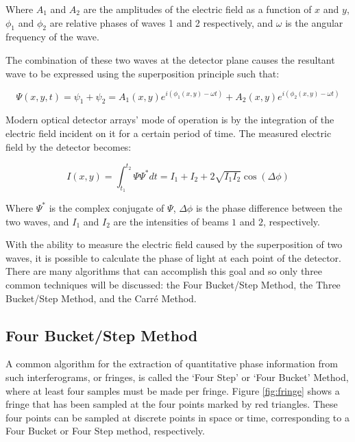 \documentclass[10pt,letterpaper]{article}
\begin{document}
 Where $A_1$ and $A_2$ are the amplitudes of the electric field as a function of $x$ and $y$, $\phi_1$ and $\phi_2$ are relative phases of waves 1 and 2 respectively, and $\omega$ is the angular frequency of the wave. 
 
 The combination of these two waves at the detector plane causes the resultant wave to be expressed using the superposition principle such that:
 
 \begin{equation}
 \Psi(x,y,t)=\psi_1+\psi_2=A_1(x,y)e^{i(\phi_1(x,y)-\omega t)}+A_2(x,y)e^{i(\phi_2(x,y)-\omega t)}
 \end{equation}
 
 Modern optical detector arrays' mode of operation is by the integration of the electric field incident on it for a certain period of time. The measured electric field by the detector becomes:
 
 \begin{equation}
 I(x,y)=\int_{t_1}^{t_2}\Psi \Psi^*dt=I_1+I_2+2\sqrt{I_1I_2}\cos(\Delta\phi)
 \label{eq:intensity}
 \end{equation}
 
 Where $\Psi^*$ is the complex conjugate of $\Psi$, $\Delta\phi$ is the phase difference between the two waves, and $I_1$ and $I_2$ are the intensities of beams $1$ and $2$, respectively.\par
 
 With the ability to measure the electric field caused by the superposition of two waves, it is possible to calculate the phase of light at each point of the detector. There are many algorithms that can accomplish this goal and so only three common techniques will be discussed: the Four Bucket/Step Method, the Three Bucket/Step Method, and the Carr\'{e} Method.\par

\subsection{Four Bucket/Step Method}
 
 A common algorithm for the extraction of quantitative phase information from such interferograms, or fringes, is called the `Four Step' or `Four Bucket' Method, where at least four samples must be made per fringe. Figure \ref{fig:fringe} shows a fringe that has been sampled at the four points marked by red triangles. These four points can be sampled at discrete points in space or time, corresponding to a Four Bucket or Four Step method, respectively.\par
 
\end{document}
